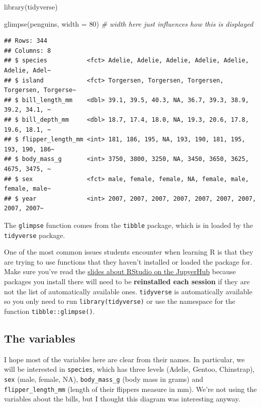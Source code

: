\documentclass[
  openany]{book}
\newenvironment{Shaded}{\begin{snugshade}}{\end{snugshade}}
\newcommand{\AttributeTok}[1]{\textcolor[rgb]{0.77,0.63,0.00}{#1}}
\newcommand{\CommentTok}[1]{\textcolor[rgb]{0.56,0.35,0.01}{\textit{#1}}}
\newcommand{\DecValTok}[1]{\textcolor[rgb]{0.00,0.00,0.81}{#1}}
\newcommand{\FunctionTok}[1]{\textcolor[rgb]{0.00,0.00,0.00}{#1}}
\newcommand{\NormalTok}[1]{#1}
\begin{document}
\begin{Shaded}
\begin{Highlighting}[]
\FunctionTok{library}\NormalTok{(tidyverse)}

\FunctionTok{glimpse}\NormalTok{(penguins, }\AttributeTok{width =} \DecValTok{80}\NormalTok{) }\CommentTok{\# width here just influences how this is displayed}
\end{Highlighting}
\end{Shaded}

\begin{verbatim}
## Rows: 344
## Columns: 8
## $ species           <fct> Adelie, Adelie, Adelie, Adelie, Adelie, Adelie, Adel~
## $ island            <fct> Torgersen, Torgersen, Torgersen, Torgersen, Torgerse~
## $ bill_length_mm    <dbl> 39.1, 39.5, 40.3, NA, 36.7, 39.3, 38.9, 39.2, 34.1, ~
## $ bill_depth_mm     <dbl> 18.7, 17.4, 18.0, NA, 19.3, 20.6, 17.8, 19.6, 18.1, ~
## $ flipper_length_mm <int> 181, 186, 195, NA, 193, 190, 181, 195, 193, 190, 186~
## $ body_mass_g       <int> 3750, 3800, 3250, NA, 3450, 3650, 3625, 4675, 3475, ~
## $ sex               <fct> male, female, female, NA, female, male, female, male~
## $ year              <int> 2007, 2007, 2007, 2007, 2007, 2007, 2007, 2007, 2007~
\end{verbatim}

The \texttt{glimpse} function comes from the \texttt{tibble} package, which is in loaded by the \texttt{tidyverse} package.

One of the most common issues students encounter when learning R is that they are trying to use functions that they haven't installed or loaded the package for. Make sure you've read the \href{https://q.utoronto.ca/courses/204826/pages/course-tools\#jupyter}{slides about RStudio on the JupyerHub} because packages you install there will need to be \textbf{reinstalled each session} if they are not the list of automatically available ones.
\texttt{tidyverse} is automatically available so you only need to run \texttt{library(tidyverse)} or use the namespace for the function \texttt{tibble::glimpse()}.

\hypertarget{the-variables}{%
\subsection{The variables}\label{the-variables}}

I hope most of the variables here are clear from their names. In particular, we will be interested in \texttt{species}, which has three levels (Adelie, Gentoo, Chinstrap), \texttt{sex} (male, female, NA), \texttt{body\_mass\_g} (body mass in grams) and \texttt{flipper\_length\_mm} (length of their flippers measure in mm). We're not using the variables about the bills, but I thought this diagram was interesting anyway.
\end{document}
